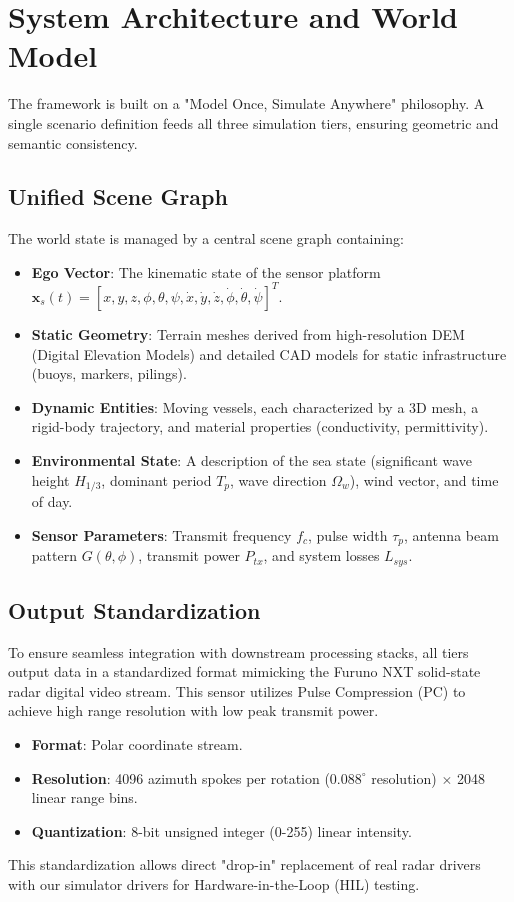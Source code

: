 \documentclass[conf]{new-aiaa}
\begin{document}
\section{System Architecture and World Model}
The framework is built on a "Model Once, Simulate Anywhere" philosophy. A single scenario definition feeds all three simulation tiers, ensuring geometric and semantic consistency.

\subsection{Unified Scene Graph}
The world state is managed by a central scene graph containing:
\begin{itemize}
    \item \textbf{Ego Vector}: The kinematic state of the sensor platform $\mathbf{x}_s(t) = [x, y, z, \phi, \theta, \psi, \dot{x}, \dot{y}, \dot{z}, \dot{\phi}, \dot{\theta}, \dot{\psi}]^T$.
    \item \textbf{Static Geometry}: Terrain meshes derived from high-resolution DEM (Digital Elevation Models) and detailed CAD models for static infrastructure (buoys, markers, pilings).
    \item \textbf{Dynamic Entities}: Moving vessels, each characterized by a 3D mesh, a rigid-body trajectory, and material properties (conductivity, permittivity).
    \item \textbf{Environmental State}: A description of the sea state (significant wave height $H_{1/3}$, dominant period $T_p$, wave direction $\Omega_w$), wind vector, and time of day.
    \item \textbf{Sensor Parameters}: Transmit frequency $f_c$, pulse width $\tau_p$, antenna beam pattern $G(\theta, \phi)$, transmit power $P_{tx}$, and system losses $L_{sys}$.
\end{itemize}

\subsection{Output Standardization}
To ensure seamless integration with downstream processing stacks, all tiers output data in a standardized format mimicking the Furuno NXT solid-state radar digital video stream. This sensor utilizes Pulse Compression (PC) to achieve high range resolution with low peak transmit power.
\begin{itemize}
    \item \textbf{Format}: Polar coordinate stream.
    \item \textbf{Resolution}: 4096 azimuth spokes per rotation ($0.088^\circ$ resolution) $\times$ 2048 linear range bins.
    \item \textbf{Quantization}: 8-bit unsigned integer (0-255) linear intensity.
\end{itemize}
This standardization allows direct "drop-in" replacement of real radar drivers with our simulator drivers for Hardware-in-the-Loop (HIL) testing.
\end{document}
